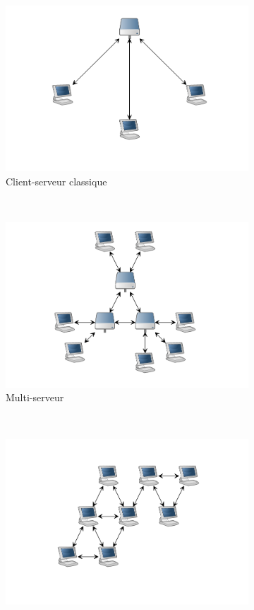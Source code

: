 \begin{figure}[b!]
		\centering
		\begin{subfigure}[t]{0.3\textwidth}
			\includegraphics[width=\textwidth]{cs.png}
			\caption{Client-serveur classique}
			\label{fig:archi_cs}
		\end{subfigure}
		~
		\begin{subfigure}[t]{0.3\textwidth}
			\includegraphics[width=\textwidth]{mcs.png}
			\caption{Multi-serveur}
			\label{fig:archi_mcs}
		\end{subfigure}
		~
		\begin{subfigure}[t]{0.3\textwidth}
			\includegraphics[width=\textwidth]{p2p.png}

\end{subfigure}
\end{figure}
